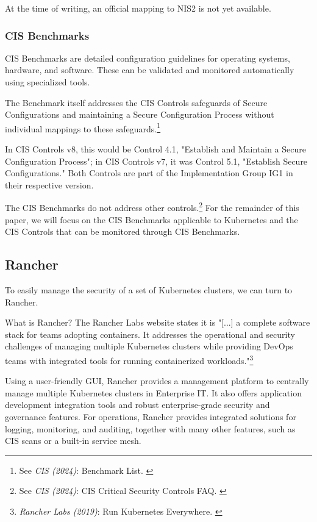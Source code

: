 At the time of writing, an official mapping to NIS2 is not yet available.

\subsubsection{CIS Benchmarks}

CIS Benchmarks are detailed configuration guidelines for operating systems, hardware, and software. These can be validated and monitored automatically using specialized tools.

The Benchmark itself addresses the CIS Controls safeguards of Secure
Configurations and maintaining a Secure Configuration Process without individual mappings to these safeguards.\footnote{See \textit{CIS (2024)}: Benchmark List. \cite{cisBenchmarks}}

In CIS Controls v8, this would be Control 4.1, "Establish and Maintain a Secure Configuration Process"; in CIS Controls v7, it was Control 5.1, "Establish Secure Configurations." Both Controls are part of the Implementation Group IG1 in their respective version.

The CIS Benchmarks do not address other controls.\footnote{See \textit{CIS (2024)}: CIS Critical Security Controls FAQ. \cite{cisFaq}} For the remainder of this paper, we will focus on the CIS Benchmarks applicable to Kubernetes and the CIS Controls that can be monitored through CIS Benchmarks.

\subsection{Rancher}

To easily manage the security of a set of Kubernetes clusters, we can turn to Rancher.

What is Rancher? The Rancher Labs website states it is "[...] a complete software stack for teams adopting containers. It addresses the operational and security challenges of managing multiple Kubernetes clusters while providing DevOps teams with integrated tools for running containerized workloads."\footnote{\textit{Rancher Labs (2019)}: Run Kubernetes Everywhere. \cite{rancher}}

Using a user-friendly GUI, Rancher provides a management platform to centrally manage multiple Kubernetes clusters in Enterprise IT. It also offers application development integration tools and robust enterprise-grade security and governance features. For operations, Rancher provides integrated solutions for logging, monitoring, and auditing, together with many other features, such as CIS scans or a built-in service mesh.

